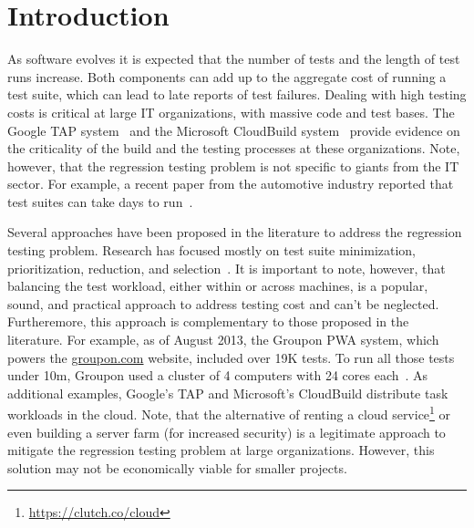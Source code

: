 \section{Introduction}


As software evolves it is expected that the number of tests and the
length of test runs increase.  Both components can add up to the
aggregate cost of running a test suite, which can lead to late reports
of test failures.  Dealing with high testing costs is critical at
large IT organizations, with massive code and test bases.  The Google
TAP system~\cite{google-tap,google-ci} and the Microsoft CloudBuild
system~\cite{prasad-shulte-ieee-microsoft-ci} provide evidence on the
criticality of the build and the testing processes at these
organizations.  Note, however, that the regression testing problem is
not specific to giants from the IT sector.  For example, a recent
paper from the automotive industry reported that test suites can take
days to run~\cite{artl-etal-icst2015}.

Several approaches have been proposed in the literature to address the
regression testing problem.  Research has focused mostly on test suite
minimization, prioritization, reduction, and
selection~\cite{yoo-harman-stvr2012}.  It is important to note,
however, that balancing the test workload, either within or across
machines, is a popular, sound, and practical approach to address
testing cost and can't be neglected.  Furtheremore, this approach is
complementary to those proposed in the literature. For example, as of
August 2013, the Groupon PWA system, which powers the
\url{groupon.com} website, included over 19K tests.  To run all those
tests under 10m, Groupon used a cluster of 4 computers with 24 cores
each~\cite{kim-etal-fse2013}.  As additional examples, Google's TAP
and Microsoft's CloudBuild distribute task workloads in the cloud.
Note, that the alternative of renting a cloud
service\footnote{\url{https://clutch.co/cloud}} or even building a
server farm (for increased security) is a legitimate approach to
mitigate the regression testing problem at large organizations.
However, this solution may not be economically viable for smaller
projects.


